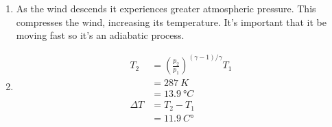 \documentclass{article}
\begin{document}
\begin{enumerate}
  \item As the wind descends it experiences greater atmospheric pressure. This compresses the wind, increasing its temperature. It's important that it be moving fast so it's an adiabatic process.

  \item

        \begin{align*}
          T_2      & = \left( \frac{p_2}{p_1} \right)^{(\gamma - 1) / \gamma} T_1 \\
                   & = \qty{287}{K}                                               \\
                   & = \qty{13.9}{\degree C}                                      \\
          \Delta T & = T_2 - T_1                                                  \\
                   & = \qty{11.9}{C \degree}
        \end{align*}
\end{enumerate}

\setcounter{subsubsection}{50}
\subsubsection{}
\end{document}
